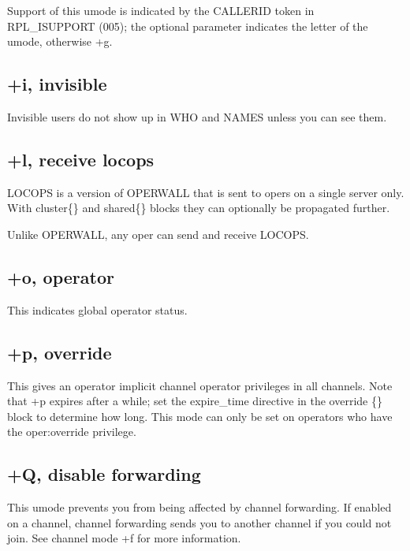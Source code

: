 	Support of this umode is indicated by the CALLERID token in
	RPL\_ISUPPORT (005); the optional parameter indicates the letter of the
	umode, otherwise +g.


\subsection{+i, invisible}

	Invisible users do not show up in WHO and NAMES unless you can see them.
 

\subsection{+l, receive locops}

	LOCOPS is a version of OPERWALL that is sent to opers on a single
	server only. With cluster\{\} and shared\{\} blocks they can optionally
	be propagated further.
 

	Unlike OPERWALL, any oper can send and receive LOCOPS.


\subsection{+o, operator}

	This indicates global operator status.


\subsection{+p, override}


	This gives an operator implicit channel operator privileges in all
	channels. Note that +p expires after a while; set the expire\_time
	directive in the override \{\} block to determine how long. This mode
	can only be set on operators who have the oper:override privilege.


\subsection{+Q, disable forwarding}


	This umode prevents you from being affected by channel forwarding. If
	enabled on a channel, channel forwarding sends you to another channel
	if you could not join. See channel mode +f for more information.


